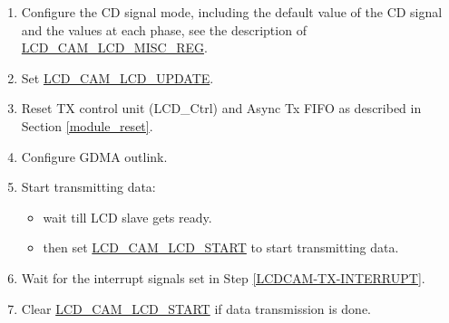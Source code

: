 \documentclass[main\_\_EN.tex]{subfiles}
\begin{document}
\begin{enumerate}
\begin{itemize}
\begin{tiplisting}
\begin{enumerate}
\begin{enumerate}
        \item or \hyperref[fielddesc:LCDCAMLCDRESET]{LCD\_CAM\_LCD\_RESET} is set;
        \item or all the data in GDMA is sent out.
    \end{enumerate}
\end{enumerate}
\end{tiplisting}
\end{itemize}
    \item Configure the CD signal mode, including the default value of the CD signal and the values at each phase, see the description of \hyperref[regdesc:LCDCAMLCDMISCREG]{LCD\_CAM\_LCD\_MISC\_REG}.

    \item Set \hyperref[fielddesc:LCDCAMLCDUPDATE]{LCD\_CAM\_LCD\_UPDATE}.

    \item Reset TX control unit (LCD\_Ctrl) and Async Tx FIFO as described in Section \ref{module_reset}.

    \item Configure GDMA outlink.

    \item Start transmitting data:
    \begin{itemize}
        \item wait till LCD slave gets ready.
        \item then set \hyperref[fielddesc:LCDCAMLCDSTART]{LCD\_CAM\_LCD\_START} to start transmitting data.
    \end{itemize}


    \item Wait for the interrupt signals set in Step \ref{LCDCAM-TX-INTERRUPT}.

    \item Clear \hyperref[fielddesc:LCDCAMLCDSTART]{LCD\_CAM\_LCD\_START} if data transmission is done.
\end{enumerate}
\end{document}
